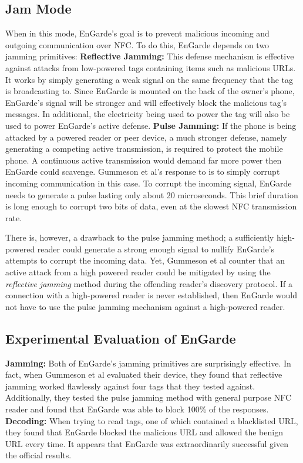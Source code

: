 \documentclass{sig-alternate}
\begin{document}
\subsection{Jam Mode}
When in this mode, EnGarde's goal is to prevent malicious incoming and outgoing communication over NFC. To do this, EnGarde depends on two jamming primitives:
\vspace{2mm}\newline
\noindent\textbf{Reflective Jamming:} This defense mechanism is effective against attacks from low-powered tags containing items such as malicious URLs. It works by simply generating a weak signal on the same frequency that the tag is broadcasting to. Since EnGarde is mounted on the back of the owner's phone, EnGarde's signal will be stronger and will effectively block the malicious tag's messages. In additional, the electricity being used to power the tag will also be used to power EnGarde's active defense.
\vspace{2mm}\newline
\noindent\textbf{Pulse Jamming:} If the phone is being attacked by a powered reader or peer device, a much stronger defense, namely generating a competing active transmission, is required to protect the mobile phone. A continuous active transmission would demand far more power then EnGarde could scavenge. Gummeson et al's response to is to simply corrupt incoming communication in this case. To corrupt the incoming signal, EnGarde needs to generate a pulse lasting only about 20 microseconds. This brief duration is long enough to corrupt two bits of data, even at the slowest NFC transmission rate.

There is, however, a drawback to the pulse jamming method; a sufficiently high-powered reader could generate a strong enough signal to nullify EnGarde's attempts to corrupt the incoming data. Yet, Gummeson et al counter that an active attack from a high powered reader could be mitigated by using the \textit{reflective jamming} method during the offending reader's discovery protocol. If a connection with a high-powered reader is never established, then EnGarde would not have to use the pulse jamming mechanism against a high-powered reader.

\subsection{Experimental Evaluation of EnGarde}
\noindent\textbf{Jamming:} Both of EnGarde's jamming primitives are surprisingly effective. In fact, when Gummeson et al evaluated their device, they found that reflective jamming worked flawlessly against four tags that they tested against. Additionally, they tested the pulse jamming method with general purpose NFC reader and found that EnGarde was able to block 100\% of the responses.
\vspace{2mm}\newline
\noindent\textbf{Decoding:} 
When trying to read tags, one of which contained a blacklisted URL, they found that EnGarde blocked the malicious URL and allowed the benign URL every time.
\vspace{2mm}\newline
It appears that EnGarde was extraordinarily successful given the official results.
\end{document}

